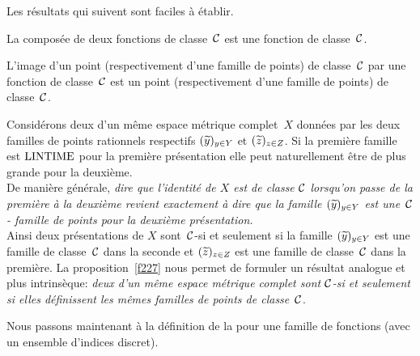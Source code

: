 \medskip 
Les résultats qui suivent sont faciles à établir.
\begin{fproposition} \label{f226}
La composée de deux fonctions \uni de classe~${{\cal C}}$  est une fonction \uni de 
classe~${{\cal C}}$. 
\end{fproposition}
\begin{fproposition} \label{f227}
L'image d'un point  (respectivement d'une famille de points)  de classe~${{\cal C}}$  
par une fonction \uni de classe~${{\cal C}}$   est un point  (respectivement d'une 
famille de points)  de classe~${{\cal C}}$. 
\end{fproposition}

\begin{fremark}\label{f228}
Considérons deux \rps  d'un même espace métrique complet~$X$ données 
par les deux familles de points rationnels respectifs  $(\widetilde{y})_{y \in 
Y}$  et  $(\widetilde{z})_{z \in Z}$.  Si la première famille est ${\rm LINTIME} $ pour 
la première présentation elle peut naturellement être de plus grande 
\com pour la deuxième. \\
De manière générale, {\em dire que l'identité de  $X$  est \uni de classe  
${{\cal C}}$   lorsqu'on passe de la première à la deuxième \pres revient 
exactement à dire que la famille $(\widetilde{y})_{y \in Y}$  est une~${{\cal C}}$-
famille de points pour la deuxième présentation.} \\
Ainsi  deux présentations de $X$ sont~${{\cal C}}$-\equivas si et seulement si la famille  $(\widetilde{y})_{y \in Y}$  est une famille de classe~${{\cal C}}$  dans la seconde \pres et $(\widetilde{z})_{z \in Z}$   est une famille de classe~${{\cal C}}$   dans la première. 
La proposition~\ref{f227} nous permet de formuler un résultat analogue et plus 
intrinsèque: {\em deux \rps  d'un même espace métrique complet sont 
${{\cal C}}$-\equivas si et seulement si elles définissent les mêmes familles de 
points de classe~${{\cal C}}$}.
\end{fremark}
Nous passons maintenant à la définition de la \com pour une famille de 
fonctions \unicos (avec un ensemble d'indices discret).

